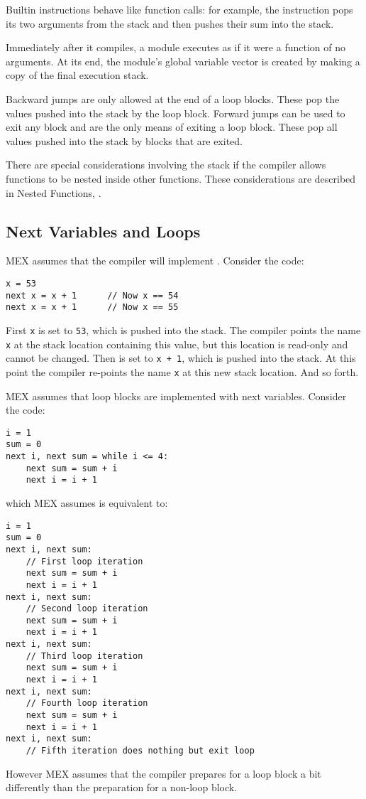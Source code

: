 \documentclass[12pt]{article}
\begin{document}
Builtin instructions behave like function calls: for example,
the  instruction pops its two arguments from the stack
and then pushes their sum into the stack.

Immediately after it compiles, a module executes as if it were a function
of no arguments.  At its end, the module's
global variable vector is created by making
a copy of the final execution stack.

Backward jumps are only allowed at the end of a loop blocks.
These pop the values pushed into the stack by the loop block.
Forward jumps can be used to exit any block and
are the only means of exiting a loop block.  These
pop all values pushed into the stack by blocks that are exited.

There are special considerations involving the stack if the
compiler allows functions to be nested inside other functions.
These considerations are described in Nested Functions,
.

\subsection{Next Variables and Loops}
\label{NEXT-VARIABLES-AND-LOOPS}

MEX assumes that the compiler will implement .
Consider the code:
\begin{indpar}\begin{verbatim}
x = 53
next x = x + 1      // Now x == 54
next x = x + 1      // Now x == 55
\end{verbatim}\end{indpar}
First {\tt x} is set to {\tt 53}, which is pushed into the stack.
The compiler points the name
{\tt x} at the stack location containing this value,
but this location is read-only and cannot be changed.
Then  is set to {\tt x + 1}, which is pushed into the stack.
At this point the compiler re-points the name {\tt x} at this new
stack location.  And so forth.

MEX assumes that loop blocks are implemented with next variables.
Consider the code:
\begin{indpar}\label{EXAMPLE-LOOP}\begin{verbatim}
i = 1
sum = 0
next i, next sum = while i <= 4:
    next sum = sum + i
    next i = i + 1
\end{verbatim}\end{indpar}
which MEX assumes is equivalent to:
\begin{indpar}\begin{verbatim}
i = 1
sum = 0
next i, next sum:
    // First loop iteration
    next sum = sum + i
    next i = i + 1
next i, next sum:
    // Second loop iteration
    next sum = sum + i
    next i = i + 1
next i, next sum:
    // Third loop iteration
    next sum = sum + i
    next i = i + 1
next i, next sum:
    // Fourth loop iteration
    next sum = sum + i
    next i = i + 1
next i, next sum:
    // Fifth iteration does nothing but exit loop
\end{verbatim}\end{indpar}
However MEX assumes that the compiler prepares for a loop
block a bit differently than the preparation for
a non-loop block.
\end{document}
